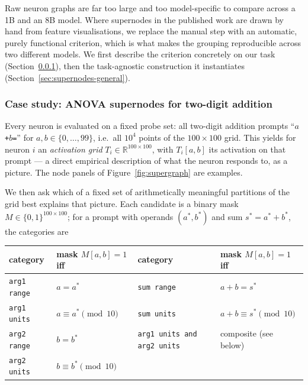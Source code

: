 \documentclass{article}
\begin{document}
Raw neuron graphs are far too large and too model-specific to compare across a 1B and an 8B model.
Where supernodes in the published work are drawn by hand from feature visualisations, we replace the
manual step with an automatic, purely functional criterion, which is what makes the grouping
reproducible across two different models. We first describe the criterion concretely on our task
(Section~\ref{sec:supernodes-casestudy}), then the task-agnostic construction it instantiates
(Section~\ref{sec:supernodes-general}).

\subsubsection{Case study: ANOVA supernodes for two-digit addition}
\label{sec:supernodes-casestudy}

Every neuron is evaluated on a fixed probe set: all two-digit addition prompts
``\texttt{$a$+$b$=}'' for $a, b \in \{0, \dots, 99\}$, i.e.\ all $10^4$ points of the
$100 \times 100$ grid. This yields for neuron $i$ an \emph{activation grid}
$T_i \in \mathbb{R}^{100 \times 100}$, with $T_i[a,b]$ its activation on that prompt --- a direct
empirical description of what the neuron responds to, as a picture. The node panels of
Figure~\ref{fig:supergraph} are examples.

We then ask which of a fixed set of arithmetically meaningful partitions of the grid best explains
that picture. Each candidate is a binary mask $M \in \{0,1\}^{100\times100}$; for a prompt with
operands $(a^{*}, b^{*})$ and sum $s^{*} = a^{*} + b^{*}$, the categories are

\begin{center}
\small
\begin{tabular}{l l @{\qquad} l l}
\toprule
category & mask $M[a,b] = 1$ iff & category & mask $M[a,b] = 1$ iff \\
\midrule
\texttt{arg1 range} & $a = a^{*}$                    & \texttt{sum range} & $a + b = s^{*}$ \\
\texttt{arg1 units} & $a \equiv a^{*} \!\!\pmod{10}$ & \texttt{sum units} & $a + b \equiv s^{*} \!\!\pmod{10}$ \\
\texttt{arg2 range} & $b = b^{*}$                    & \texttt{arg1 units and arg2 units} & composite (see below) \\
\texttt{arg2 units} & $b \equiv b^{*} \!\!\pmod{10}$ & & \\
\bottomrule
\end{tabular}
\end{center}
\end{document}

